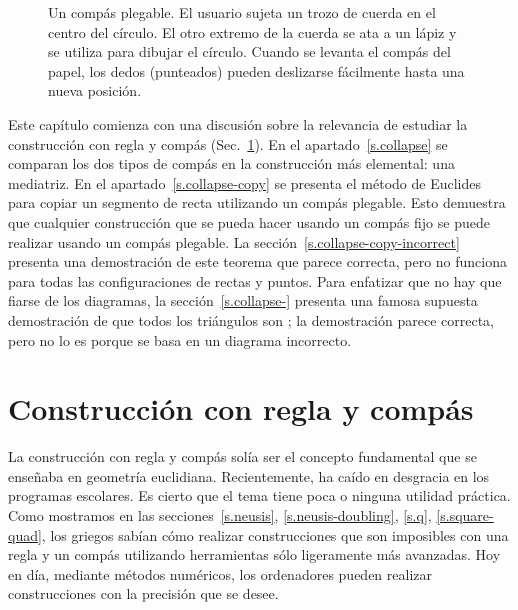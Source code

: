 \begin{figure}[htb]
\begin{minipage}{.45\textwidth}
\caption{Un compás plegable. El usuario sujeta un trozo de cuerda en el centro del círculo. El otro extremo de la cuerda se ata a un lápiz y se utiliza para dibujar el círculo. Cuando se levanta el compás del papel, los dedos (punteados) pueden deslizarse fácilmente hasta una nueva posición.}\label{fig.collapsing-compass}
\end{minipage}
\end{figure}

Este capítulo comienza con una discusión sobre la relevancia de estudiar la construcción con regla y compás (Sec.~\ref{s.relevance}).
En el apartado~\ref{s.collapse} se comparan los dos tipos de compás en la construcción más elemental: una mediatriz. En el apartado~\ref{s.collapse-copy} se presenta el método de Euclides para copiar un segmento de recta utilizando un compás plegable. Esto demuestra que cualquier construcción que se pueda hacer usando un compás fijo se puede realizar usando un compás plegable. La sección~\ref{s.collapse-copy-incorrect} presenta una demostración de este teorema que parece correcta, pero no funciona para todas las configuraciones de rectas y puntos. Para enfatizar que no hay que fiarse de los diagramas, la sección~\ref{s.collapse-} presenta una famosa supuesta demostración de que todos los triángulos son ; la demostración parece correcta, pero no lo es porque se basa en un diagrama incorrecto.

\section{Construcción con regla y compás}\label{s.relevance}

La construcción con regla y compás solía ser el concepto fundamental que se enseñaba en geometría euclidiana. Recientemente, ha caído en desgracia en los programas escolares. Es cierto que el tema tiene poca o ninguna utilidad práctica. Como mostramos en las secciones~\ref{s.neusis}, \ref{s.neusis-doubling}, \ref{s.q}, \ref{s.square-quad}, los griegos sabían cómo realizar construcciones que son imposibles con una regla y un compás utilizando herramientas sólo ligeramente más avanzadas. Hoy en día, mediante métodos numéricos, los ordenadores pueden realizar construcciones con la precisión que se desee.

